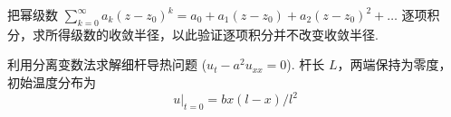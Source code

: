 \documentclass[quiet]{ctexart}
\begin{document}
\begin{problem}[本题 4 分]
  把幂级数 $\sum_{k = 0}^\infty a_k (z - z_0)^k = a_0 + a_1(z - z_0) + a_2(z - z_0)^2 + \ldots$ 逐项积分，求所得级数的收敛半径，以此验证逐项积分并不改变收敛半径.
\end{problem}
\begin{solution}
  
\end{solution}

\begin{problem}[本题 10 分]
  利用分离变数法求解细杆导热问题 ($u_t - a^2u_{xx} = 0$). 杆长 $L$，两端保持为零度，初始温度分布为
  \[u\big|_{t = 0 }= bx(l - x)/l^2\]
\end{problem}
\begin{solution}
  
\end{solution}
\end{document}

